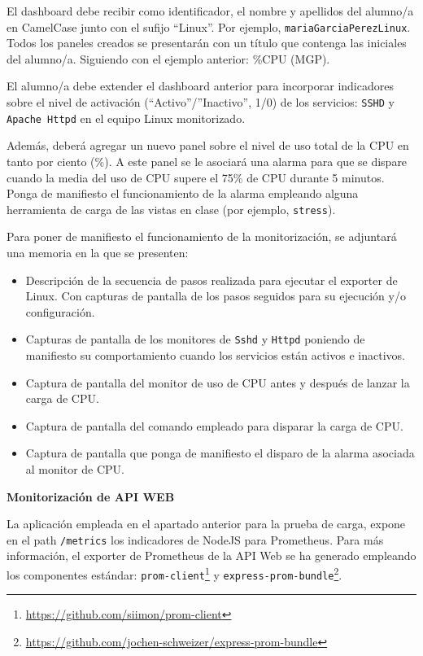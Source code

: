 El dashboard debe recibir como identificador, el nombre y apellidos del alumno/a en CamelCase junto con el sufijo “Linux”. Por ejemplo, \texttt{mariaGarciaPerezLinux}. Todos los paneles creados se presentarán con un título que contenga las iniciales del alumno/a. Siguiendo con el ejemplo anterior: \%CPU (MGP).

El alumno/a debe extender el dashboard anterior para incorporar indicadores sobre el nivel de activación (“Activo”/”Inactivo”, 1/0) de los servicios: \texttt{SSHD} y \texttt{Apache Httpd} en el equipo Linux monitorizado.

Además, deberá agregar un nuevo panel sobre el nivel de uso total de la CPU en tanto por ciento (\%). A este panel se le asociará una alarma para que se dispare cuando la media del uso de CPU supere el 75\% de CPU durante 5 minutos. Ponga de manifiesto el funcionamiento de la alarma empleando alguna herramienta de carga de las vistas en clase (por ejemplo, \texttt{stress}).

Para poner de manifiesto el funcionamiento de la monitorización, se adjuntará una memoria en la que se presenten:
\begin{itemize}
    \item Descripción de la secuencia de pasos realizada para ejecutar el exporter de Linux. Con capturas de pantalla de los pasos seguidos para su ejecución y/o configuración.
    \item Capturas de pantalla de los monitores de \texttt{Sshd} y \texttt{Httpd} poniendo de manifiesto su comportamiento cuando los servicios están activos e inactivos.
    \item Captura de pantalla del monitor de uso de CPU antes y después de lanzar la carga de CPU.
    \item Captura de pantalla del comando empleado para disparar la carga de CPU.
    \item Captura de pantalla que ponga de manifiesto el disparo de la alarma asociada al monitor de CPU.
\end{itemize}

\textbf{Monitorización de API WEB}

La aplicación empleada en el apartado anterior para la prueba de carga, expone en el path \texttt{/metrics} los indicadores de NodeJS para Prometheus. Para más información, el exporter de Prometheus de la API Web se ha generado empleando los componentes estándar: \texttt{prom-client}\footnote{\url{https://github.com/siimon/prom-client}} y \texttt{express-prom-bundle}\footnote{\url{https://github.com/jochen-schweizer/express-prom-bundle}}.

